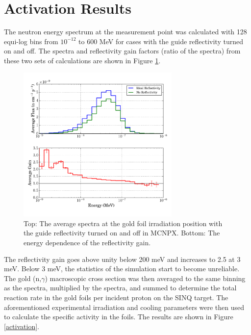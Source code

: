 \documentclass[a4paper,
              ]{jacow}
\begin{document}
\section{Activation Results}

The neutron energy spectrum at the measurement point was calculated with 128 equi-log bins from $10^{-12}$ to 600 MeV for cases with the guide reflectivity turned on and off.  The spectra and reflectivity gain factors (ratio of the spectra) from these two sets of calculations are shown in Figure \ref{gain}.  

\begin{figure}[!htb]
   \centering
   \includegraphics*[trim = 0mm 5mm 0mm 5mm, width=80mm]{graphics/gain.pdf}
   \caption{Top: The average spectra at the gold foil irradiation position with the guide reflectivity turned on and off in MCNPX.  Bottom: The energy dependence of the reflectivity gain.}
   \label{gain}
\end{figure}

The reflectivity gain goes above unity below 200 meV and increases to 2.5 at 3 meV.  Below 3 meV, the statistics of the simulation start to become unreliable.  The gold (n,$\gamma$) macroscopic cross section was then averaged to the same binning as the spectra, multiplied by the spectra, and summed to determine the total reaction rate in the gold foils per incident proton on the SINQ target.  The aforementioned experimental irradiation and cooling parameters were then used to calculate the specific activity in the foils.  The results are shown in Figure \ref{activation}.
\end{document}
